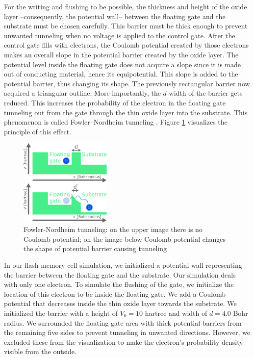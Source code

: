 For the writing and flushing to be possible, the thickness and height of the oxide layer --consequently, the potential wall-- between the floating gate and the substrate must be chosen carefully.
This barrier must be thick enough to prevent unwanted tunneling when no voltage is applied to the control gate.
After the control gate fills with electrons, the Coulomb potential created by those electrons makes an overall slope in the potential barrier created by the oxide layer.
The potential level inside the floating gate does not acquire a slope since it is made out of conducting material, hence its equipotential.
This slope is added to the potential barrier, thus changing its shape.
The previously rectangular barrier now acquired a triangular outline. More importantly, the $d$ width of the barrier gets reduced.
This increases the probability of the electron in the floating gate tunneling out from the gate through the thin oxide layer into the substrate.
This phenomenon is called Fowler–Nordheim tunneling \cite{Fowler_1928bv}.
Figure \ref{fig:fowler_nordheim_tunneling} visualizes the principle of this effect.
\begin{figure}[hbt!]
	\centering
	\includegraphics[width=0.4\textwidth]{figures/fowler_nordheim_tunneling.pdf}
	\caption{Fowler-Nordheim tunneling: on the upper image there is no Coulomb potential; on the image below Coulomb potential changes the shape of potential barrier causing tunneling}
	\label{fig:fowler_nordheim_tunneling}
\end{figure}
In our flash memory cell simulation, we initialized a potential wall representing the barrier between the floating gate and the substrate.
Our simulation deals with only one electron.
To simulate the flushing of the gate, we initialize the location of this electron to be inside the floating gate.
We add a Coulomb potential that decreases inside the thin oxide layer towards the substrate.
We initialized the barrier with a height of $V_0 = 10$ hartree and width of $d = 4.0$ Bohr radius.
We surrounded the floating gate area with thick potential barriers from the remaining five sides to prevent tunneling in unwanted directions. However, we excluded these from the visualization to make the electron's probability density visible from the outside.
